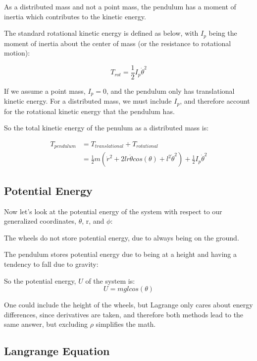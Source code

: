 As a distributed mass and not a point mass, the pendulum has a moment of inertia which contributes to the kinetic energy.

The standard rotational kinetic energy is defined as below, with $I_p$ being the moment of inertia about the center of mass (or the resistance to rotational motion):

\begin{equation}
	T_{rot} = \frac{1}{2}I_p\dot{\theta}^2
\end{equation}

If we assume a point mass, $I_p = 0$, and the pendulum only has translational kinetic energy. For a distributed mass, we must include $I_p$, and therefore account for the rotational kinetic energy that the pendulum has.

So the total kinetic energy of the penulum as a distributed mass is:

\begin{align}
	T_{pendulum} &= T_{translational} + T_{rotational} \\
							 &= \frac{1}{2}m(\dot{r}^2 + 2l\dot{r}\dot{\theta}cos(\theta) + l^2\dot{\theta}^2) + \frac{1}{2}I_p\dot{\theta}^2
\end{align} 

\subsection{Potential Energy}
Now let's look at the potential energy of the system with respect to our generalized coordinates, $\theta$, r, and $\phi$:	

The wheels do not store potential energy, due to always being on the ground.

The pendulum stores potential energy due to being at a height and having a tendency to fall due to gravity:

So the potential energy, $U$ of the system is:
\begin{equation}
	U = mglcos(\theta)
\end{equation}

One could include the height of the wheels, but Lagrange only cares about energy differences, since derivatives are taken, and therefore both methods lead to the same answer, but excluding $\rho$ simplifies the math.

\subsection{Langrange Equation}

